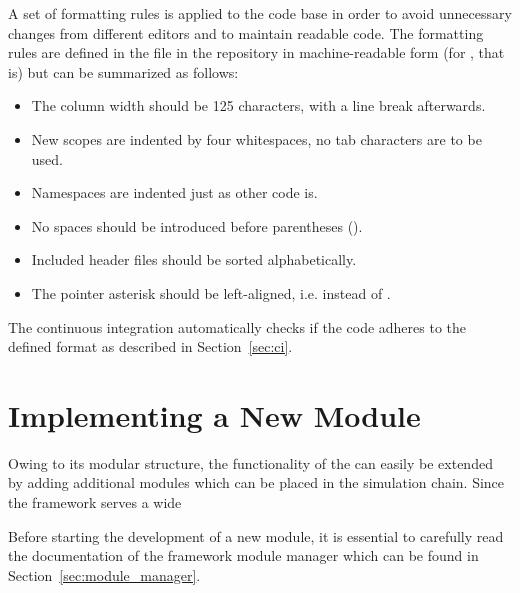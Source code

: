 A set of formatting rules is applied to the code base in order to avoid unnecessary changes from different editors and to maintain readable code.
The formatting rules are defined in the  file in the repository in machine-readable form (for , that is) but can be summarized as follows:

\begin{itemize}
  \item The column width should be 125 characters, with a line break afterwards.
  \item New scopes are indented by four whitespaces, no tab characters are to be used.
  \item Namespaces are indented just as other code is.
  \item No spaces should be introduced before parentheses ().
  \item Included header files should be sorted alphabetically.
  \item The pointer asterisk should be left-aligned, i.e.  instead of .
\end{itemize}
The continuous integration automatically checks if the code adheres to the defined format as described in Section~\ref{sec:ci}.

\section{Implementing a New Module}
\label{sec:building_new_module}

Owing to its modular structure, the functionality of the \apsq can easily be extended by adding additional modules which can be placed in the simulation chain.
Since the framework serves a wide

Before starting the development of a new module, it is essential to carefully read the documentation of the framework module manager which can be found in Section~\ref{sec:module_manager}.

